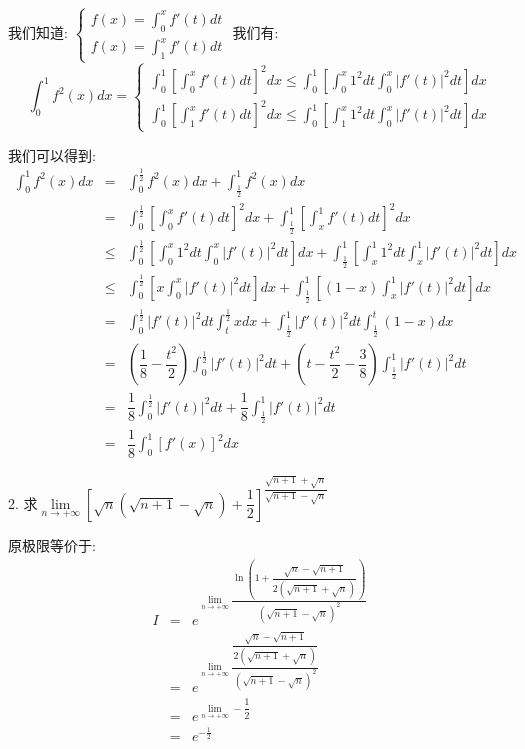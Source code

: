 \begin{solution}

	我们知道:  $\left\lbrace
	\begin{array}{l}
		f(x)=\int_{0}^{x}f'(t)dt\\
		f(x)=\int_{1}^{x}f'(t)dt
	\end{array}
	\right. $
	我们有:  $$\int_{0}^{1}f^{2}(x)dx=\left\lbrace
	\begin{array}{l}
		\int_{0}^{1}\left[\int_{0}^{x}f'(t)dt \right]^2dx\leq \int_{0}^{1}[\int_{0}^{x}1^2dt\int_{0}^{x}|f'(t)|^2dt]dx\\
		\int_{0}^{1}\left[\int_{1}^{x}f'(t)dt \right]^2dx\leq \int_{0}^{1}[\int_{1}^{x}1^2dt\int_{0}^{x}|f'(t)|^2dt]dx
	\end{array}
	\right.$$
	
	我们可以得到:  
	\begin{eqnarray*}
		\int_{0}^{1}f^{2}(x)dx&=&\int_{0}^{\frac{1}{2}}f^{2}(x)dx+\int_{\frac{1}{2}}^{1}f^{2}(x)dx\\
		&=&\int_{0}^{\frac{1}{2}}\left[\int_{0}^{x}f'(t)dt \right]^2dx+\int_{\frac{1}{2}}^{1}\left[\int_{x}^{1}f'(t)dt \right]^2dx\\
		&\leq&\int_{0}^{\frac{1}{2}}[\int_{0}^{x}1^2dt\int_{0}^{x}|f'(t)|^2dt]dx+\int_{\frac{1}{2}}^{1}[\int_{x}^{1}1^2dt\int_{x}^{1}|f'(t)|^2dt]dx\\
		&\leq&\int_{0}^{\frac{1}{2}}[x\int_{0}^{x}|f'(t)|^2dt]dx+\int_{\frac{1}{2}}^{1}[(1-x)\int_{x}^{1}|f'(t)|^2dt]dx\\
		&=&\int_{0}^{\frac{1}{2}}|f'(t)|^2dt\int_{t}^{\frac{1}{2}}xdx+\int_{\frac{1}{2}}^{1}|f'(t)|^2dt\int_{\frac{1}{2}}^{t}(1-x)dx\\
		&=&(\dfrac{1}{8}-\dfrac{t^2}{2})\int_{0}^{\frac{1}{2}}|f'(t)|^2dt+(t-\dfrac{t^2}{2}-\dfrac{3}{8})\int_{\frac{1}{2}}^{1}|f'(t)|^2dt\\
		&=&\dfrac{1}{8}\int_{0}^{\frac{1}{2}}|f'(t)|^2dt+\dfrac{1}{8}\int_{\frac{1}{2}}^{1}|f'(t)|^2dt\\
		&=&\dfrac{1}{8}\int_{0}^{1}[f'(x)]^2dx
	\end{eqnarray*}
\end{solution}

2. 求$\lim\limits_{n\rightarrow+\infty}\left[\sqrt{n}(\sqrt{n+1}-\sqrt{n})+\dfrac{1}{2} \right]^{\dfrac{\sqrt{n+1}+\sqrt{n}}{\sqrt{n+1}-\sqrt{n}}} $
\begin{solution}

	原极限等价于:  
	\begin{eqnarray*}
		I&=&e^{\lim\limits_{n\rightarrow+\infty}\dfrac{\ln\left( 1+\dfrac{\sqrt{n}-\sqrt{n+1}}{2(\sqrt{n+1}+\sqrt{n})}\right)}{(\sqrt{n+1}-\sqrt{n})^2}}\\
		&=&e^{\lim\limits_{n\rightarrow+\infty}\dfrac{\dfrac{\sqrt{n}-\sqrt{n+1}}{2(\sqrt{n+1}+\sqrt{n})}}{(\sqrt{n+1}-\sqrt{n})^2}}\\
		&=&e^{\lim\limits_{n\rightarrow+\infty}-\dfrac{1}{2}}\\
		&=&e^{-\frac{1}{2}}
	\end{eqnarray*}
\end{solution}

